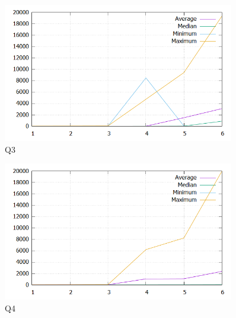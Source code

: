 \documentclass[a4paper]{scrreprt}
\begin{document}
\begin{figure}[h]
\centering
\includegraphics[width=0.9\textwidth]{images/q3-plot.png}
\caption {Q3}
\end{figure}

\begin{figure}[h]
\centering
\includegraphics[width=0.9\textwidth]{images/q4-plot.png}
\caption {Q4}
\end{figure}
\end{document}
